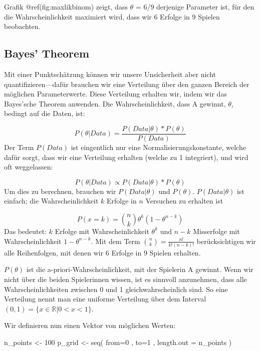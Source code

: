 \documentclass[]{tufte-handout}
\newenvironment{Shaded}{}{}
\newcommand{\AttributeTok}[1]{\textcolor[rgb]{0.49,0.56,0.16}{#1}}
\newcommand{\DecValTok}[1]{\textcolor[rgb]{0.25,0.63,0.44}{#1}}
\newcommand{\FunctionTok}[1]{\textcolor[rgb]{0.02,0.16,0.49}{#1}}
\newcommand{\NormalTok}[1]{#1}
\newcommand{\OtherTok}[1]{\textcolor[rgb]{0.00,0.44,0.13}{#1}}
\begin{document}
Grafik @ref(fig:maxlikbinom) zeigt, dass \(\theta\) = 6/9 derjenige
Parameter ist, für den die Wahrscheinlichkeit maximiert wird, dass wir 6
Erfolge in 9 Spielen beobachten.

\hypertarget{bayes-theorem}{%
\subsection{Bayes' Theorem}\label{bayes-theorem}}

Mit einer Punktschätzung können wir unsere Unsicherheit aber nicht
quantifizieren---dafür brauchen wir eine Verteilung über den ganzen
Bereich der möglichen Parameterwerte. Diese Verteilung erhalten wir,
indem wir das Bayes'sche Theorem anwenden. Die Wahrscheinlichkeit, dass
A gewinnt, \(\theta\), bedingt auf die Daten, ist:

\[ P(\theta|Data) = \frac{ P(Data|\theta) * P(\theta) } {P(Data)}\] Der
Term \(P(Data)\) ist eingentlich nur eine Normalisierungskonstante,
welche dafür sorgt, dass wir eine Verteilung erhalten (welche zu 1
integriert), und wird oft weggelassen:

\[ P(\theta|Data) \propto P(Data|\theta) * P(\theta) \] Um dies zu
berechnen, brauchen wir \(P(Data|\theta)\) und \(P(\theta)\).
\(P(Data|\theta)\) ist einfach; die Wahrscheinlichkeit \(k\) Erfolge in
\(n\) Versuchen zu erhalten ist

\[ P(x = k) = {n \choose k} \theta^k (1-\theta^{n-k}) \] Das bedeutet:
\(k\) Erfolge mit Wahrscheinlichkeit \(\theta^k\) und \(n-k\)
Misserfolge mit Wahrscheinlichkeit \(1-\theta^{n-k}\). Mit dem Term
\(\binom{n}{k} = \frac{n!}{k!(n-k)!}\) berücksichtigen wir alle
Reihenfolgen, mit denen wir 6 Erfolge in 9 Spielen erhalten.

\(P(\theta)\) ist die a-priori-Wahrscheinlichkeit, mit der Spielerin A
gewinnt. Wenn wir nicht über die beiden Spielerinnen wissen, ist es
sinnvoll anzunehmen, dass alle Wahrscheinlichkeiten zwischen 0 und 1
gleichwahrscheinlich sind. So eine Verteilung nennt man eine uniforme
Verteilung über dem Interval
\(\left(0, 1\right) = \{x \in \mathbb{R} | 0 < x < 1 \}\).

Wir definieren nun einen Vektor von möglichen Werten:

\begin{Shaded}
\begin{Highlighting}[]
\NormalTok{n\_points }\OtherTok{\textless{}{-}} \DecValTok{100}
\NormalTok{p\_grid }\OtherTok{\textless{}{-}} \FunctionTok{seq}\NormalTok{( }\AttributeTok{from=}\DecValTok{0}\NormalTok{ , }\AttributeTok{to=}\DecValTok{1}\NormalTok{ , }\AttributeTok{length.out =}\NormalTok{ n\_points )}
\end{Highlighting}
\end{Shaded}
\end{document}
